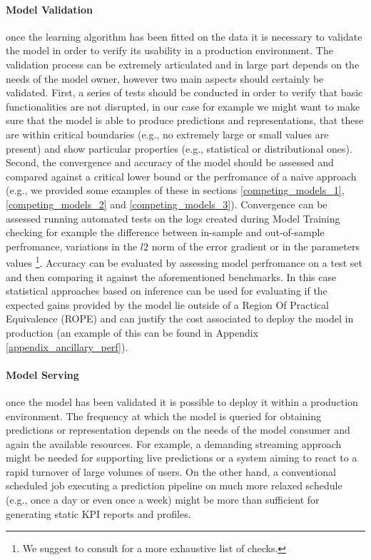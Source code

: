 \paragraph*{Model Validation} once the learning algorithm has been fitted on the data it is necessary to validate the model in order to verify its usability in a production environment. The validation process can be extremely articulated and in large part depends on the needs of the model owner, however two main aspects should certainly be validated. First, a series of tests should be conducted in order to verify that basic functionalities are not disrupted, in our case for example we might want to make sure that the model is able to produce predictions and representations, that these are within critical boundaries (e.g., no extremely large or small values are present) and show particular properties (e.g., statistical or distributional ones). Second, the convergence and accuracy of the model should be assessed and compared against a critical lower bound or the perfromance of a naive approach (e.g., we provided some examples of these in sections \ref{competing_models_1}, \ref{competing_models_2} and \ref{competing_models_3}). Convergence can be assessed running automated tests on the logs created during Model Training checking for example the difference between in-sample and out-of-sample perfromance, variations in the $l2$ norm of the error gradient or in the parameters values \footnote{We suggest to consult \cite{bengio2017deep} for a more exhaustive list of checks.}. Accuracy can be evaluated by assessing model perfromance on a test set and then comparing it against the aforementioned benchmarks. In this case statistical approaches based on inference can be used for evaluating if the expected gains provided by the model lie outside of a Region Of Practical Equivalence (ROPE) and can justify the cost associated to deploy the model in production (an example of this can be found in Appendix \ref{appendix_ancillary_perf}).

\paragraph*{Model Serving} once the model has been validated it is possible to deploy it within a production environment. The frequency at which the model is queried for obtaining predictions or representation depends on the needs of the model consumer and again the available resources. For example, a demanding streaming approach might be needed for supporting live predictions or a system aiming to react to a rapid turnover of large volumes of users. On the other hand, a conventional scheduled job executing a prediction pipeline on much more relaxed schedule (e.g., once a day or even once a week) might be more than sufficient for generating static KPI reports and profiles.

